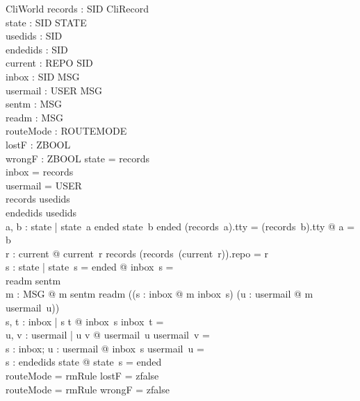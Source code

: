\documentclass[a4paper,10pt,fleqn]{article}
\begin{document}
\begin{schema}{CliWorld}
  records : SID \pfun CliRecord \\
  state : SID \pfun STATE \\
  usedids : \power SID \\
  endedids : \power SID \\
  current : REPO \pfun SID \\
  inbox : SID \pfun \power MSG \\
  usermail : USER \pfun \power MSG \\
  sentm : \power MSG \\
  readm : \power MSG \\
  routeMode : ROUTEMODE \\
  lostF : ZBOOL \\
  wrongF : ZBOOL
  \where
  \dom state = \dom records \\
  \dom inbox = \dom records \\
  \dom usermail = USER \\
  \dom records \subseteq usedids \\
  endedids \subseteq usedids \\
  \forall a, b : \dom state |
    state~a \neq ended \land state~b \neq ended
      \land (records~a).tty = (records~b).tty @ a = b \\
  \forall r : \dom current @
    current~r \in \dom records
      \land (records~(current~r)).repo = r \\
  \forall s : \dom state | state~s = ended @ inbox~s = \emptyset \\
  readm \subseteq sentm \\
  \forall m : MSG @
    m \in sentm \setminus readm \iff
      ((\exists s : \dom inbox @ m \in inbox~s)
        \lor (\exists u : \dom usermail @ m \in usermail~u)) \\
  \forall s, t : \dom inbox | s \neq t @ inbox~s \cap inbox~t = \emptyset \\
  \forall u, v : \dom usermail | u \neq v @
    usermail~u \cap usermail~v = \emptyset \\
  \forall s : \dom inbox; u : \dom usermail @
    inbox~s \cap usermail~u = \emptyset \\
  \forall s : endedids \cap \dom state @ state~s = ended \\
  routeMode = rmRule \implies lostF = zfalse \\
  routeMode = rmRule \implies wrongF = zfalse
\end{schema}
\end{document}
